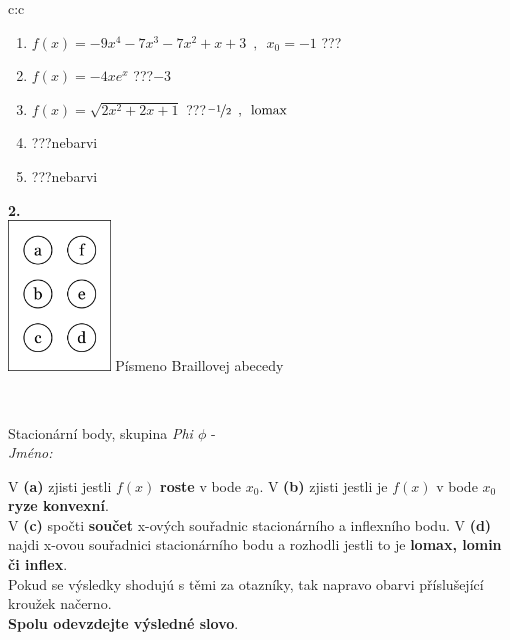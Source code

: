 \documentclass[10pt]{report}
\begin{document}
\begin{tabular}{c:c}
\begin{minipage}[c][104.5mm][t]{0.5\linewidth}
\begin{center}
\begin{minipage}{0.79\linewidth}
\begin{center}
\begin{varwidth}{\linewidth}
\begin{enumerate}
\item $f(x)=-9x^4-7x^3-7x^2+x+3\enspace , \enspace x_0=-1$\quad \dotfill\; ???\;\dotfill \quad {}
\item $f(x)=-4xe^{x}$\quad \dotfill\; ???\;\dotfill \quad $-3$
\item $f(x)=\sqrt{2x^2+2x+1}$\quad \dotfill\; ???\;\dotfill \quad $\nicefrac{-1}{2}\enspace , \enspace\mathrm{lomax}$
\item \quad \dotfill\; ???\;\dotfill \quad nebarvi
\item \quad \dotfill\; ???\;\dotfill \quad nebarvi
\end{enumerate}
\end{varwidth}
\end{center}
\end{minipage}
\begin{minipage}{0.20\linewidth}
\begin{center}
{\Huge\bfseries 2.} \\[2mm]
\includegraphics[height=40mm]{../images/braille.png}
{\small Písmeno Braillovej abecedy}
\end{center}
\end{minipage}
\end{center}
\end{minipage}
\\ \hdashline
\begin{minipage}[c][104.5mm][t]{0.5\linewidth}
\begin{center}
\vspace{7mm}
{\huge Stacionární body, skupina \textit{Phi $\phi$} -}\\[5mm]
\textit{Jméno:}\phantom{xxxxxxxxxxxxxxxxxxxxxxxxxxxxxxxxxxxxxxxxxxxxxxxxxxxxxxxxxxxxxxxxx}\\[5mm]
\begin{minipage}{0.95\linewidth}
\begin{center}
{\small V \textbf{(a)} zjisti jestli $f(x)$ \textbf{roste} v bode $x_0$. V \textbf{(b)} zjisti jestli je $f(x)$ v bode $x_0$ \textbf{ryze konvexní}.\\V \textbf{(c)} spočti \textbf{součet} x-ových souřadnic stacionárního a inflexního bodu. V \textbf{(d)} najdi x-ovou souřadnici stacionárního bodu a rozhodli jestli to je \textbf{lomax, lomin či inflex}.\\Pokud se výsledky shodujú s těmi za otazníky, tak napravo obarvi příslušející kroužek načerno.\\\textbf{Spolu odevzdejte výsledné slovo}}.

\end{center}
\end{minipage}
\end{center}
\end{minipage}
\end{tabular}
\end{document}
